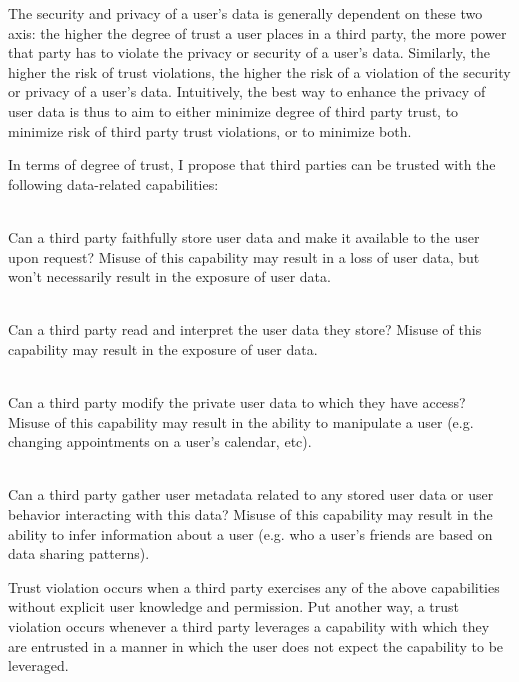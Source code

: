 The security and privacy of a user's data is generally dependent on
these two axis: the higher the degree of trust a user places in a
third party, the more power that party has to violate the privacy or
security of a user's data. Similarly, the higher the risk of trust
violations, the higher the risk of a violation of the security or
privacy of a user's data.  Intuitively, the best way to enhance the
privacy of user data is thus to aim to either minimize degree of third
party trust, to minimize risk of third party trust violations, or to
minimize both.

In terms of degree of trust, I propose that third parties can be
trusted with the following data-related capabilities:

\begin{packed_desc}
\item[Storage (S-Capability):] \hfill \\ Can a third party faithfully
  store user data and make it available to the user upon request?
  Misuse of this capability may result in a loss of user data, but
  won't necessarily result in the exposure of user data.
\item[Access (R-Capability):] \hfill \\ Can a third party read and
  interpret the user data they store? Misuse of this capability may
  result in the exposure of user data.
\item[Manipulation (W-Capability):] \hfill \\ Can a third party modify
  the private user data to which they have access? Misuse of this
  capability may result in the ability to manipulate a user
  (e.g. changing appointments on a user's calendar, etc).
\item[Meta-analysis (M-Capability):] \hfill \\ Can a third party
  gather user metadata related to any stored user data or user
  behavior interacting with this data? Misuse of this capability may
  result in the ability to infer information about a user (e.g. who a
  user's friends are based on data sharing patterns).
\end{packed_desc}

Trust violation occurs when a third party exercises any of the above
capabilities without explicit user knowledge and permission. Put
another way, a trust violation occurs whenever a third party leverages
a capability with which they are entrusted in a manner in which the
user does not expect the capability to be leveraged.

